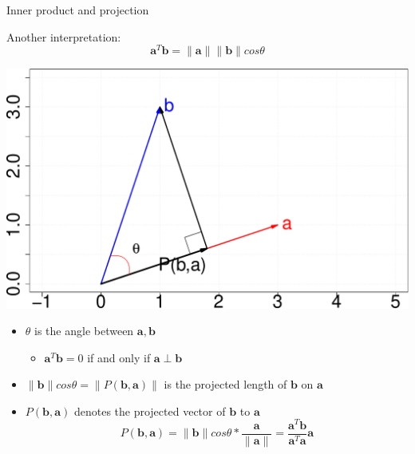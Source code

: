 \documentclass[ignorenonframetext,]{beamer}
\providecommand{\tightlist}{%
  \setlength{\itemsep}{0pt}\setlength{\parskip}{0pt}}
\newcommand{\vv}[1]{\boldsymbol{#1}}
\begin{document}
\begin{frame}{Inner product and projection}
\protect\hypertarget{inner-product-and-projection}{}

Another interpretation:
\[\vv{a}^T \vv{b} = \|\vv{a}\| \|\vv{b}\|cos \theta\]

\begin{center}\includegraphics[width=0.45\linewidth]{math4ml_files/figure-beamer/unnamed-chunk-5-1} \end{center}

\begin{itemize}
\tightlist
\item
  \(\theta\) is the angle between \(\vv{a}, \vv{b}\)

  \begin{itemize}
  \tightlist
  \item
    \(\vv{a}^T\vv{b}=0\) if and only if \(\vv{a} \perp \vv{b}\) 
  \end{itemize}
\item
  \(\|\vv{b}\|cos \theta = \|P(\vv{b}, \vv{a})\|\) is the projected
  length of \(\vv{b}\) on \(\vv{a}\)
\item
  \(P(\vv{b}, \vv{a})\) denotes the projected vector of \(\vv{b}\) to
  \(\vv{a}\)
  \[P(\vv{b}, \vv{a}) = \|\vv{b}\|cos \theta * \frac{\vv{a}}{\|\vv{a}\|} =  \frac{\vv{a}^T\vv{b}}{\vv{a}^T\vv{a}}  \vv{a}\]
\end{itemize}

\end{frame}
\end{document}
